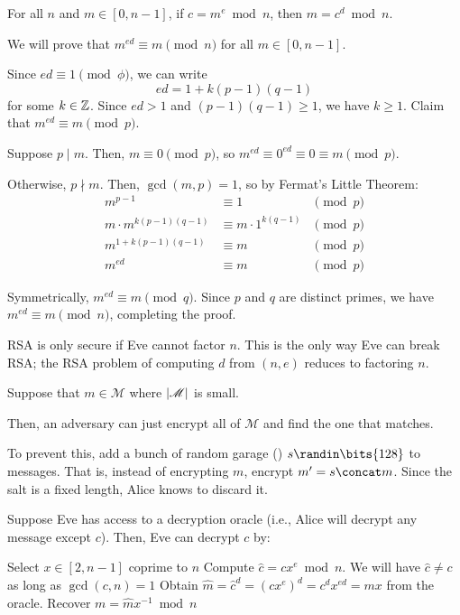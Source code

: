 \documentclass[class=co487,tikz,minted,notes]{agony}
\begin{document}
\begin{theorem}
  For all $n$ and $m \in [0,n-1]$, if $c = m^e \bmod n$, then $m = c^d \bmod n$.
\end{theorem}
\begin{prf}
  We will prove that $m^{ed} \equiv m \pmod n$ for all $m \in [0, n-1]$.

  Since $ed \equiv 1 \pmod{\phi}$, we can write
  \[ ed = 1 + k(p-1)(q-1) \]
  for some $k \in \mathbb{Z}$.
  Since $ed > 1$ and $(p-1)(q-1) \geq 1$, we have $k \geq 1$.
  Claim that $m^{ed} \equiv m \pmod p$.

  Suppose $p \mid m$. Then, $m \equiv 0 \pmod p$,
  so $m^{ed} \equiv 0^{ed} \equiv 0 \equiv m \pmod p$.

  Otherwise, $p \nmid m$. Then, $\gcd(m,p) = 1$,
  so by Fermat's Little Theorem:
  \begin{align*}
    m^{p-1}                 & \equiv 1                  & \pmod p \\
    m \cdot m^{k(p-1)(q-1)} & \equiv m \cdot 1^{k(q-1)} & \pmod p \\
    m^{1 + k(p-1)(q-1)}     & \equiv m                  & \pmod p \\
    m^{ed}                  & \equiv m                  & \pmod p
  \end{align*}

  Symmetrically, $m^{ed} \equiv m \pmod q$.
  Since $p$ and $q$ are distinct primes, we have $m^{ed} \equiv m \pmod n$,
  completing the proof.
\end{prf}

RSA is only secure if Eve cannot factor $n$.
This is the only way Eve can break RSA;
the RSA problem of computing $d$ from $(n,e)$ reduces to factoring $n$.

\begin{attack}
  Suppose that $m \in \mathscr{M}$ where $\abs{\mathscr{M}}$ is small.

  Then, an adversary can just encrypt all of $\mathscr{M}$ and find the one that matches.
\end{attack}

To prevent this, add a bunch of random garage () $s \randin \bits{128}$ to messages.
That is, instead of encrypting $m$, encrypt $m' = s \concat m$.
Since the salt is a fixed length, Alice knows to discard it.

\begin{attack}
  Suppose Eve has access to a decryption oracle
  (i.e., Alice will decrypt any message except $c$).
  Then, Eve can decrypt $c$ by:
  \begin{algorithmic}[1]
    \State Select $x \in [2,n-1]$ coprime to $n$
    \State Compute $\hat c = cx^e \bmod n$. We will have $\hat c \neq c$ as long as $\gcd(c,n) = 1$
    \State Obtain $\hat m = \hat c^d = (cx^e)^d = c^dx^{ed} = mx$ from the oracle.
    \State Recover $m = \hat m x^{-1} \bmod n$
  \end{algorithmic}
\end{attack}
\end{document}
